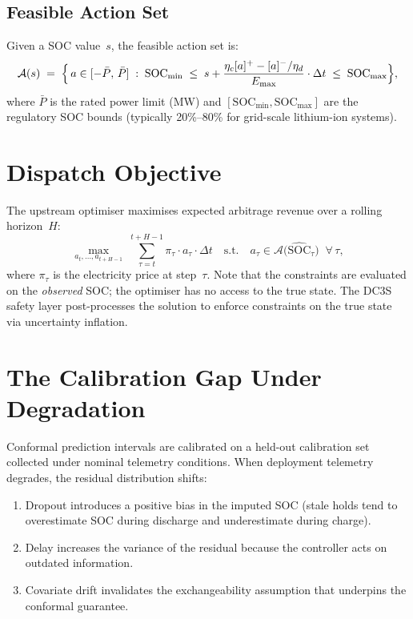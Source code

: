 \subsection{Feasible Action Set}

Given a SOC value~$s$, the feasible action set is:
\begin{equation}
\label{eq:feasible-set}
  \mathcal{A}(s) \;=\; \Bigl\{\,a \in [-\bar{P},\, \bar{P}] \;:\;
  \mathrm{SOC}_{\min} \;\le\;
  s + \frac{\eta_c [a]^{+} - [a]^{-}/\eta_d}{E_{\max}} \cdot \Delta t
  \;\le\; \mathrm{SOC}_{\max}\Bigr\},
\end{equation}
where $\bar{P}$ is the rated power limit (MW) and
$[\mathrm{SOC}_{\min}, \mathrm{SOC}_{\max}]$ are the regulatory SOC
bounds (typically 20\%--80\% for grid-scale lithium-ion systems).

\section{Dispatch Objective}

The upstream optimiser maximises expected arbitrage revenue over a
rolling horizon~$H$:
\begin{equation}
\label{eq:dispatch-obj}
  \max_{a_t, \ldots, a_{t+H-1}} \;\sum_{\tau=t}^{t+H-1}
  \pi_\tau \cdot a_\tau \cdot \Delta t
  \quad \text{s.t.} \quad
  a_\tau \in \mathcal{A}\!\bigl(\widehat{\mathrm{SOC}}_\tau\bigr)
  \;\;\forall\, \tau,
\end{equation}
where $\pi_\tau$ is the electricity price at step~$\tau$.  Note that the
constraints are evaluated on the \emph{observed} SOC; the optimiser has
no access to the true state.  The DC3S safety layer post-processes the
solution to enforce constraints on the true state via uncertainty
inflation.

\section{The Calibration Gap Under Degradation}
\label{sec:calibration-gap}

Conformal prediction intervals are calibrated on a held-out calibration
set collected under nominal telemetry conditions.  When deployment
telemetry degrades, the residual distribution shifts:

\begin{enumerate}
  \item Dropout introduces a positive bias in the imputed SOC (stale
    holds tend to overestimate SOC during discharge and underestimate
    during charge).
  \item Delay increases the variance of the residual because the
    controller acts on outdated information.
  \item Covariate drift invalidates the exchangeability assumption that
    underpins the conformal guarantee.
\end{enumerate}

